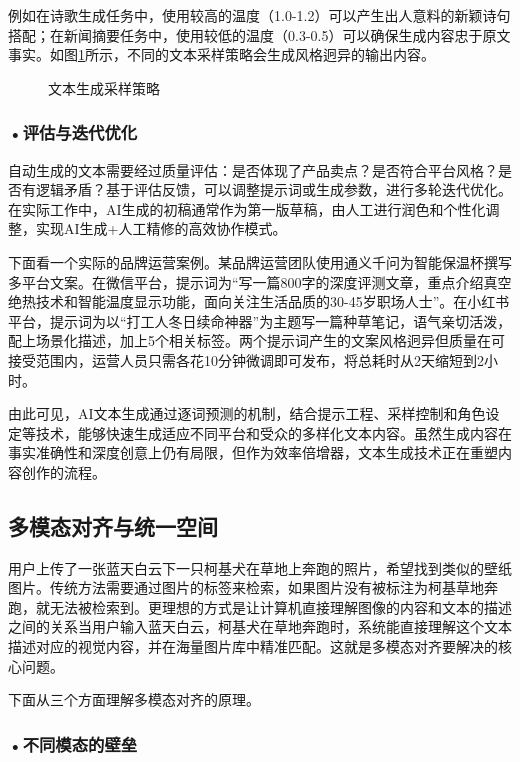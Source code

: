 例如在诗歌生成任务中，使用较高的温度（1.0-1.2）可以产生出人意料的新颖诗句搭配；在新闻摘要任务中，使用较低的温度（0.3-0.5）可以确保生成内容忠于原文事实。如图\ref{fig:ch2_2_30}所示，不同的文本采样策略会生成风格迥异的输出内容。

\begin{figure}[H]
\centering
{}
\caption{文本生成采样策略}
\label{fig:ch2_2_30}
\end{figure}

\subsubsection*{\textbf{•评估与迭代优化}}

自动生成的文本需要经过质量评估：是否体现了产品卖点？是否符合平台风格？是否有逻辑矛盾？基于评估反馈，可以调整提示词或生成参数，进行多轮迭代优化。在实际工作中，AI生成的初稿通常作为第一版草稿，由人工进行润色和个性化调整，实现AI生成+人工精修的高效协作模式。

下面看一个实际的品牌运营案例。某品牌运营团队使用通义千问为智能保温杯撰写多平台文案。在微信平台，提示词为“写一篇800字的深度评测文章，重点介绍真空绝热技术和智能温度显示功能，面向关注生活品质的30-45岁职场人士”。在小红书平台，提示词为以“打工人冬日续命神器”为主题写一篇种草笔记，语气亲切活泼，配上场景化描述，加上5个相关标签。两个提示词产生的文案风格迥异但质量在可接受范围内，运营人员只需各花10分钟微调即可发布，将总耗时从2天缩短到2小时。

由此可见，AI文本生成通过逐词预测的机制，结合提示工程、采样控制和角色设定等技术，能够快速生成适应不同平台和受众的多样化文本内容。虽然生成内容在事实准确性和深度创意上仍有局限，但作为效率倍增器，文本生成技术正在重塑内容创作的流程。



\subsection{多模态对齐与统一空间}
用户上传了一张蓝天白云下一只柯基犬在草地上奔跑的照片，希望找到类似的壁纸图片。传统方法需要通过图片的标签来检索，如果图片没有被标注为柯基草地奔跑，就无法被检索到。更理想的方式是让计算机直接理解图像的内容和文本的描述之间的关系当用户输入蓝天白云，柯基犬在草地奔跑时，系统能直接理解这个文本描述对应的视觉内容，并在海量图片库中精准匹配。这就是多模态对齐要解决的核心问题。

下面从三个方面理解多模态对齐的原理。

\subsubsection*{\textbf{•不同模态的壁垒}}

